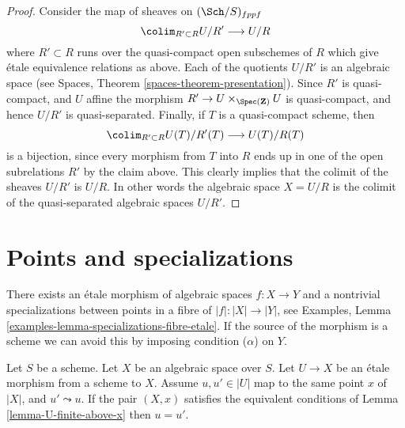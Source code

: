\begin{proof}
\medskip\noindent
Consider the map of sheaves on $(\Sch/S)_{fppf}$
$$
\colim_{R' \subset R} U/R' \longrightarrow U/R
$$
where $R' \subset R$ runs over the quasi-compact open subschemes
of $R$ which give \'etale equivalence relations as above. Each of the
quotients $U/R'$ is an algebraic space
(see Spaces, Theorem \ref{spaces-theorem-presentation}).
Since $R'$ is quasi-compact, and $U$ affine the morphism
$R' \to U \times_{\Spec(\mathbf{Z})} U$ is quasi-compact,
and hence $U/R'$ is quasi-separated. Finally, if $T$ is a quasi-compact
scheme, then
$$
\colim_{R' \subset R} U(T)/R'(T) \longrightarrow U(T)/R(T)
$$
is a bijection, since every morphism from $T$ into $R$ ends up in one
of the open subrelations $R'$ by the claim above. This clearly implies
that the colimit of the sheaves $U/R'$ is $U/R$. In other words
the algebraic space $X = U/R$ is the colimit of the quasi-separated
algebraic spaces $U/R'$.
\end{proof}











\section{Points and specializations}
\label{section-specializations}

\noindent
There exists an \'etale morphism of algebraic spaces $f : X \to Y$
and a nontrivial specializations between points in a fibre of
$|f| : |X| \to |Y|$, see
Examples, Lemma \ref{examples-lemma-specializations-fibre-etale}.
If the source of the morphism is a scheme we can avoid this by
imposing condition ($\alpha$) on $Y$.

\begin{lemma}
\label{lemma-no-specializations-map-to-same-point}
Let $S$ be a scheme.
Let $X$ be an algebraic space over $S$.
Let $U \to X$ be an \'etale morphism from a scheme to $X$.
Assume $u, u' \in |U|$ map to the same point $x$ of $|X|$, and
$u' \leadsto u$. If the pair $(X, x)$ satisfies the
equivalent conditions of
Lemma \ref{lemma-U-finite-above-x}
then $u = u'$.
\end{lemma}

